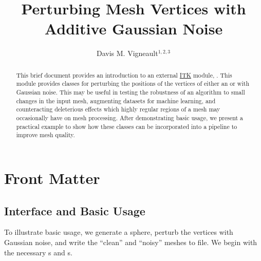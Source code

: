 \documentclass{InsightArticle}
\title{Perturbing Mesh Vertices with Additive Gaussian Noise}
\author{Davis M. Vigneault$^{1,2,3}$}
\newcommand{\IJhandlerIDnumber}{xxxx}
\begin{document}
%
%
\IJhandlefooter{\IJhandlerIDnumber}


\ifpdf
\else
\fi


\maketitle


\ifhtml
\chapter*{Front Matter\label{front}}
\fi


\begin{abstract}
\noindent
This brief document provides an introduction to an external \href{wwwk.itk.org}{ITK} module, .  This module provides classes for perturbing the positions of the vertices of either an  or  with Gaussian noise.  This may be useful in testing the robustness of an algorithm to small changes in the input mesh, augmenting datasets for machine learning, and counteracting deleterious effects which highly regular regions of a mesh may occasionally have on mesh processing.  After demonstrating basic usage, we present a practical example to show how these classes can be incorporated into a pipeline to improve mesh quality.

\end{abstract}

\IJhandlenote{\IJhandlerIDnumber}

\tableofcontents


\section{Interface and Basic Usage}

To illustrate basic usage, we generate a sphere, perturb the vertices with Gaussian noise, and write the ``clean'' and ``noisy'' meshes to file.  We begin with the necessary s and s.
\end{document}

